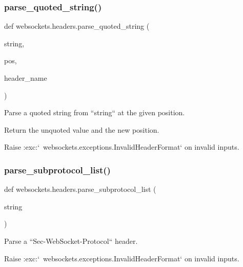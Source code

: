 \subsubsection{\texorpdfstring{parse\+\_\+quoted\+\_\+string()}{parse\_quoted\_string()}}
{\footnotesize\ttfamily def websockets.\+headers.\+parse\+\_\+quoted\+\_\+string (\begin{DoxyParamCaption}\item[{}]{string,  }\item[{}]{pos,  }\item[{}]{header\+\_\+name }\end{DoxyParamCaption})}

\begin{DoxyVerb}Parse a quoted string from ``string`` at the given position.

Return the unquoted value and the new position.

Raise :exc:`~websockets.exceptions.InvalidHeaderFormat` on invalid inputs.\end{DoxyVerb}
 \mbox{\label{namespacewebsockets_1_1headers_adcc756ea3357b56bd6d635c3c77c9676}} 
\subsubsection{\texorpdfstring{parse\+\_\+subprotocol\+\_\+list()}{parse\_subprotocol\_list()}}
{\footnotesize\ttfamily def websockets.\+headers.\+parse\+\_\+subprotocol\+\_\+list (\begin{DoxyParamCaption}\item[{}]{string }\end{DoxyParamCaption})}

\begin{DoxyVerb}Parse a ``Sec-WebSocket-Protocol`` header.

Raise :exc:`~websockets.exceptions.InvalidHeaderFormat` on invalid inputs.\end{DoxyVerb}
 \mbox{\label{namespacewebsockets_1_1headers_a49b06afdce23783ce96048511261e115}} 
